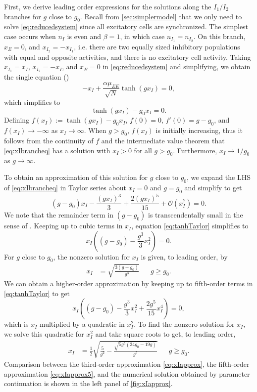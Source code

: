 \documentclass[reqno]{siamonline190516}
\begin{document}
First, we derive leading order expressions for the solutions along the $I_1/I_2$ branches for $g$ close to $g_0$. Recall from \cref{sec:simplermodel} that we only need to solve \cref{eq:reducedsystem} since all excitatory cells are synchronized. The simplest case occurs when $n_I$ is even and $\beta = 1$, in which case $n_{I_1}=n_{I_2}$. On this branch, $x_E = 0$, and $x_{I_2} = -x_{I_1}$, i.e. there are two equally sized inhibitory populations with equal and opposite activities, and there is no excitatory cell activity. Taking $x_{I_1} = x_I$, $x_{I_2} = -x_I$, and $x_E = 0$ in \cref{eq:reducedsystem} and simplifying, we obtain the single equation (\cite[{Eq. 16}]{Barreiro2017})
\[
-x_I + \frac{\alpha \mu_{EE} }{\sqrt{N}} \tanh(g x_I) = 0, 
\]
which simplifies to 
\begin{equation}\label{eq:xIbrancheq}
\tanh(g x_I) - g_0 x_I = 0.
\end{equation}
Defining $f(x_I) := \tanh(g x_I) - g_0 x_I$, $f(0) = 0$, $f'(0) = g - g_0$, and $f(x_I) \rightarrow -\infty$ as $x_I \rightarrow \infty$. When $g > g_0$, $f(x_I)$ is initially increasing, thus it follows from the continuity of $f$ and the intermediate value theorem that \cref{eq:xIbrancheq} has a solution with $x_I > 0$ for all $g > g_0$. Furthermore, $x_I \rightarrow 1/g_0$ as $g \rightarrow \infty$.

To obtain an approximation of this solution for $g$ close to $g_0$, we expand the LHS of \cref{eq:xIbrancheq} in Taylor series about $x_I = 0$ and $g = g_0$ and simplify to get
\begin{equation}\label{eq:tanhTaylor}
(g-g_0) x_I - \frac{(g x_I)^3}{3} + \frac{2(g x_I)^5}{15} + \mathcal{O}\left( x_I^7 \right) = 0.
\end{equation}
We note that the remainder term in $(g-g_0)$ is transcendentally small in the sense of \cite{Holmes2012}. Keeping up to cubic terms in $x_I$, equation \cref{eq:tanhTaylor} simplifies to
\[
x_I \left( (g - g_0) - \frac{g^3}{3} x_I^2 \right) = 0.
\]
For $g$ close to $g_0$, the nonzero solution for $x_I$ is given, to leading order, by
\begin{align}\label{eq:xIapprox}
x_I &= \sqrt{ \frac{3(g - g_0) }{g^3}} && g \geq g_0.
\end{align}
We can obtain a higher-order approximation by keeping up to fifth-order terms in \cref{eq:tanhTaylor} to get
\begin{equation*}
x_I \left( (g - g_0) - \frac{g^3}{3} x_I^2 + \frac{2 g^5}{15} x_I^4 \right) = 0,
\end{equation*}
which is $x_I$ multiplied by a quadratic in $x_I^2$. To find the nonzero solution for $x_I$, we solve this quadratic for $x_I^2$ and take square roots to get, to leading order,
\begin{align}\label{eq:xIapprox5}
x_I &= \frac{1}{2} \sqrt{ \frac{5}{g^2} - \frac{\sqrt{ 5 g^5( 24 g_0 - 19 g) }}{g^5}} && g \geq g_0.
\end{align}
Comparison between the third-order approximation \cref{eq:xIapprox}, the fifth-order approximation \cref{eq:xIapprox5}, and the numerical solution obtained by parameter continuation is shown in the left panel of \cref{fig:xIapprox}.
\end{document}
